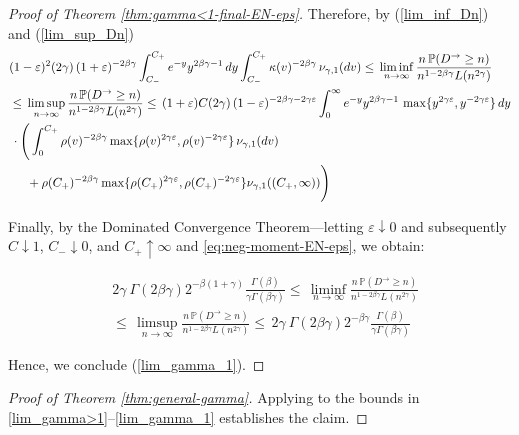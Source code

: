 \documentclass[preprint]{imsart}
\newcommand{\PP}{\mathbb{P}}
\newcommand{\1}{\mathbf{1}}
\theoremstyle{plain}
\theoremstyle{definition}
\begin{document}
\begin{proof}[Proof of Theorem \ref{thm:gamma<1-final-EN-eps}]
Therefore, by (\ref{lim_inf_Dn}) and (\ref{lim_sup_Dn})
\small
\begin{equation*}
    \begin{split}
       &(1-\varepsilon)^2(2\gamma)\,(1+\varepsilon)^{-2\beta\gamma}\int_{C_{-}}^{C_{+}} e^{-y}y^{2\beta\gamma-1} \,dy\int_{C_{-}}^{C_{+}}\kappa(v)^{-2\beta\gamma}\,\nu_{\gamma,1}(dv)\le\,\liminf_{n\to \infty} \frac{n\,\PP(D^{\rightarrow}\ge n)}{n^{1-2\beta\gamma}L(n^{2\gamma})}\\
       &\le\,\limsup_{n\to \infty} \frac{n\,\PP(D^{\rightarrow}\ge n)}{n^{1-2\beta\gamma}L(n^{2\gamma})}\le\,(1+\varepsilon)C(2\gamma)\,(1-\varepsilon)^{-2\beta\gamma-2\gamma\varepsilon} \int_{0}^{\infty} e^{-y}y^{2\beta\gamma-1}\,\max\{y^{2\gamma\varepsilon},y^{-2\gamma\varepsilon}\} \,dy\\
       &\,\cdot\Bigg(\int_0^{C_{+}}\rho(v)^{-2\beta\gamma}\max\{\rho(v)^{2\gamma\varepsilon},\rho(v)^{-2\gamma\varepsilon}\}\,\nu_{\gamma,1}(dv)\\
        &\hspace{5mm}+\rho(C_{+})^{-2\beta\gamma}\max\{\rho(C_{+})^{2\gamma\varepsilon},\rho(C_{+})^{-2\gamma\varepsilon}\}\nu_{\gamma,1}((C_{+},\infty))\Bigg)
    \end{split}
\end{equation*}
\normalsize

Finally, by the Dominated Convergence Theorem—letting \(\varepsilon \downarrow 0\) and subsequently \(C \downarrow 1\), \(C_{-} \downarrow 0\), and \(C_{+} \uparrow \infty\) and \eqref{eq:neg-moment-EN-eps}, we obtain:


\begin{equation*}
    \begin{split}
       &2\gamma\ \Gamma(2\beta\gamma)2^{-\beta(1+\gamma)}\frac{\Gamma(\beta)}{\gamma\Gamma(\beta\gamma)}\le\,\liminf_{n\to \infty} \frac{n\,\PP(D^{\rightarrow}\ge n)}{n^{1-2\beta\gamma}L(n^{2\gamma})}\\
       &\le\,\limsup_{n\to \infty} \frac{n\,\PP(D^{\rightarrow}\ge n)}{n^{1-2\beta\gamma}L(n^{2\gamma})}\le\, 2\gamma\ \Gamma(2\beta\gamma)2^{-\beta\gamma}\frac{\Gamma(\beta)}{\gamma\Gamma(\beta\gamma)}
    \end{split}
\end{equation*}


Hence, we conclude (\ref{lim_gamma_1}).

\end{proof}


\begin{proof}[Proof of Theorem \ref{thm:general-gamma}]
Applying \cite[Proposition~1.2]{CarvalhoMachado2025} to the bounds in \eqref{lim_gamma>1}–\eqref{lim_gamma_1} establishes the claim.
\end{proof}
\end{document}
